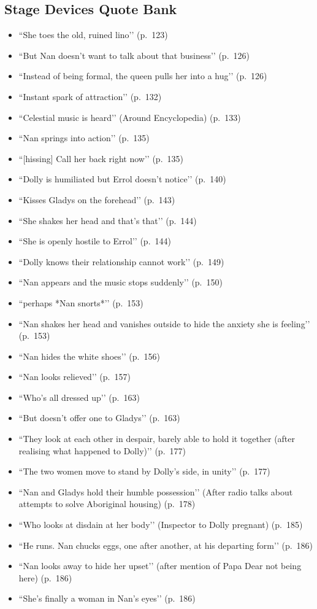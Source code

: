 \documentclass[a4paper]{article}
\begin{document}
\subsection{Stage Devices Quote Bank}
\begin{itemize}
    \item ``She toes the old, ruined lino’’ (p.~123)
    \item ``But Nan doesn’t want to talk about that business’’ (p.~126)
    \item ``Instead of being formal, the queen pulls her into a hug’’ (p.~126)
    \item ``Instant spark of attraction’’ (p.~132)
    \item ``Celestial music is heard’’ (Around Encyclopedia) (p.~133)
    \item ``Nan springs into action’’ (p.~135)
    \item ``[hissing] Call her back right now’’ (p.~135)
    \item ``Dolly is humiliated but Errol doesn’t notice’’ (p.~140)
    \item ``Kisses Gladys on the forehead’’ (p.~143)
    \item ``She shakes her head and that’s that’’ (p.~144)
    \item ``She is openly hostile to Errol’’ (p.~144)
    \item ``Dolly knows their relationship cannot work’’ (p.~149)
    \item ``Nan appears and the music stops suddenly’’ (p.~150)
    \item ``perhaps *Nan snorts*’’ (p.~153)
    \item ``Nan shakes her head and vanishes outside to hide the anxiety she is feeling’’ (p.~153)
    \item ``Nan hides the white shoes’’ (p.~156)
    \item ``Nan looks relieved’’ (p.~157)
    \item ``Who’s all dressed up’’ (p.~163)
    \item ``But doesn’t offer one to Gladys’’ (p.~163)
    \item ``They look at each other in despair, barely able to hold it together (after realising what happened to Dolly)’’ (p.~177)
    \item ``The two women move to stand by Dolly’s side, in unity’’ (p.~177)
    \item ``Nan and Gladys hold their humble possession’’ (After radio talks about attempts to solve Aboriginal housing) (p.~178)
    \item ``Who looks at disdain at her body’’ (Inspector to Dolly pregnant) (p.~185)
    \item ``He runs. Nan chucks eggs, one after another, at his departing form’’ (p.~186)
    \item ``Nan looks away to hide her upset’’ (after mention of Papa Dear not being here) (p.~186)
    \item ``She’s finally a woman in Nan’s eyes’’ (p.~186)
\end{itemize}
\end{document}
